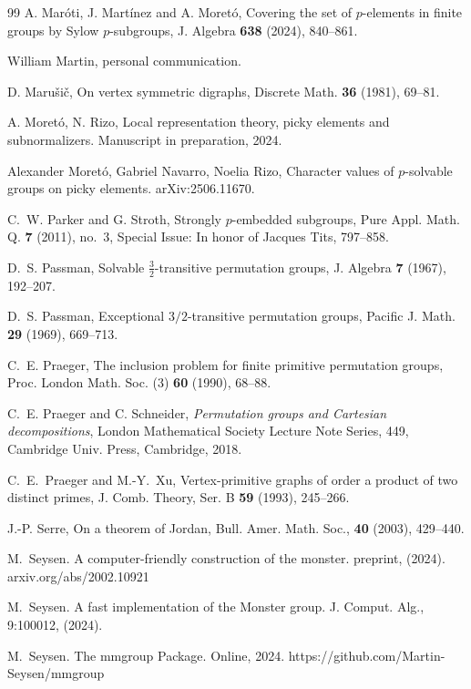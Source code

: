 \documentclass{article}
\theoremstyle{remark}
\theoremstyle{definition}
\begin{document}
\begin{thebibliography}{99}
A. Mar\'oti, J. Mart\'inez and A. Moret\'o, Covering the set of $p$-elements in finite groups by Sylow $p$-subgroups, J. Algebra {\bf 638} (2024), 840--861.


William Martin, personal communication.

D. Maru\v si\v c, On vertex symmetric digraphs, Discrete Math. {\bf 36} (1981),  69--81.


A. Moret\'{o}, N. Rizo, Local representation theory, picky elements and subnormalizers. Manuscript in preparation, 2024.

Alexander Moret\'{o}, Gabriel Navarro, Noelia Rizo,
Character values of $p$-solvable groups on picky elements.
arXiv:2506.11670.


C.~W. Parker and G. Stroth, Strongly $p$-embedded subgroups, Pure Appl. Math. Q. {\bf 7} (2011), no.~3, Special Issue: In honor of Jacques Tits, 797--858.

D.~S. Passman, Solvable $\frac{3}{2}$-transitive permutation groups, J. Algebra {\bf 7} (1967), 192--207.

D.~S. Passman, Exceptional $3/2$-transitive permutation groups, Pacific J. Math. {\bf 29} (1969), 669--713.

C.~E. Praeger, The inclusion problem for finite primitive permutation groups, Proc. London Math. Soc. (3) {\bf 60} (1990),  68--88.

C.~E. Praeger and C. Schneider, {\it Permutation groups and Cartesian decompositions}, London Mathematical Society Lecture Note Series, 449, Cambridge Univ. Press, Cambridge, 2018.

C.~E.~Praeger and M.-Y.~Xu, Vertex-primitive graphs of order a product of two distinct primes, J. Comb. Theory, Ser. B \textbf{59} (1993),  245--266.


J.-P. Serre, On a theorem of {J}ordan,
 Bull. Amer. Math. Soc., \textbf{40} (2003), 429--440.


M.~Seysen. A computer-friendly construction of the monster. preprint, (2024). arxiv.org/abs/2002.10921

M.~Seysen. A fast implementation of the Monster group. J. Comput. Alg., 9:100012, (2024). 

M.~Seysen. The mmgroup Package. Online, 2024. https://github.com/Martin-Seysen/mmgroup



\end{thebibliography}
\end{document}
